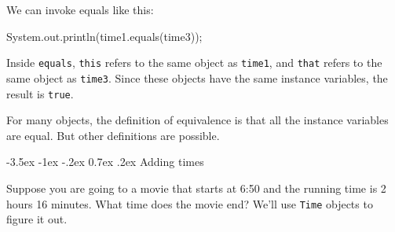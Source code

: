 \documentclass[12pt]{book}
\makeatletter
\theoremstyle{exercise}
\newcommand{\java}[1]{\verb"#1"}
\renewcommand{\section}{\@startsection{section}{1}{\z@}%
    {-3.5ex \@plus -1ex \@minus -.2ex}%
    {0.7ex \@plus.2ex}%
    {\normalfont\Large\bfseries}}
\newcommand{\java}[1]{\lstinline{#1}} %
\makeatother
\begin{document}
We can invoke equals like this:

\begin{code}
    System.out.println(time1.equals(time3));
\end{code}

Inside \java{equals}, \java{this} refers to the same object as \java{time1}, and \java{that} refers to the same object as \java{time3}.
Since these objects have the same instance variables, the result is \java{true}.






For many objects, the definition of equivalence is that all the instance variables are equal.
But other definitions are possible.


\section{Adding times}


Suppose you are going to a movie that starts at 6:50 and the running time is 2 hours 16 minutes.
What time does the movie end?
We'll use \java{Time} objects to figure it out.
\end{document}
